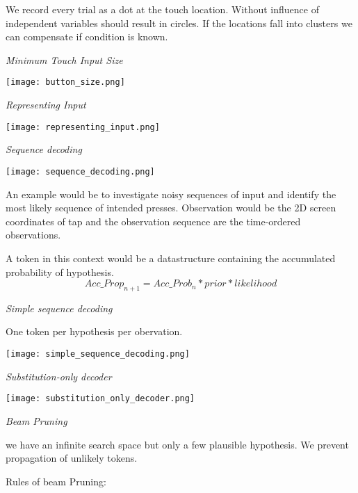 We record every trial as a dot at the touch location. Without influence of independent variables should result in circles. If the locations fall into clusters we can compensate if condition is known. \medskip

\textit{Minimum Touch Input Size}

\begin{center}
	\texttt{[image: button\_size.png]}
\end{center}

\textit{Representing Input} \smallskip


\begin{center}
	\texttt{[image: representing\_input.png]}
\end{center}

\columnbreak

\textit{Sequence decoding} \smallskip

\begin{center}
	\texttt{[image: sequence\_decoding.png]}
\end{center}

An example would be to investigate noisy sequences of input and identify the most likely sequence of intended presses.
Observation would be the 2D screen coordinates of tap and the observation sequence are the time-ordered observations. 
\smallskip

A token in this context would be a datastructure containing the accumulated probability of hypothesis. 
$$Acc\_Prop_{n+1} = Acc\_Prob_{n} * prior * likelihood$$


\textit{Simple sequence decoding} \smallskip

One token per hypothesis per obervation. 


\begin{center}
	\texttt{[image: simple\_sequence\_decoding.png]}
\end{center}


\textit{Substitution-only decoder} \smallskip

\begin{center}
	\texttt{[image: substitution\_only\_decoder.png]}
\end{center}

\textit{Beam Pruning} \smallskip

we have an infinite search space but only a few plausible hypothesis. We prevent propagation of unlikely tokens. 

Rules of beam Pruning: 


